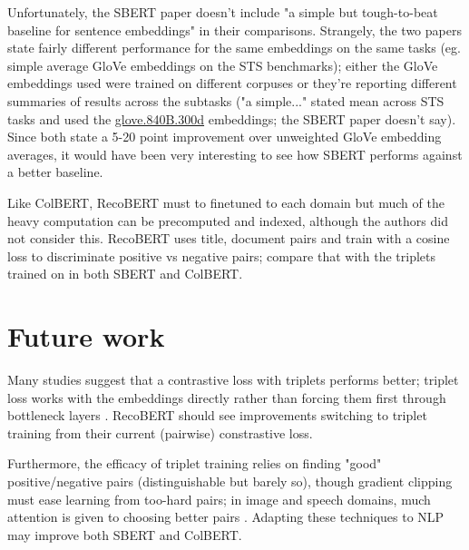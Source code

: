 \documentclass[11pt]{article}
\begin{document}
Unfortunately, the SBERT paper doesn't include "a simple but tough-to-beat baseline for sentence embeddings" \cite{Arora2017} in their comparisons. Strangely, the two papers state fairly different performance for the same embeddings on the same tasks (eg. simple average GloVe embeddings \cite{GloVe} on the STS benchmarks); either the GloVe embeddings used were trained on different corpuses or they're reporting different summaries of results across the subtasks ("a simple..." stated mean across STS tasks and used the \href{https://nlp.stanford.edu/projects/glove/}{glove.840B.300d} embeddings; the SBERT paper doesn't say). Since both state a 5-20 point improvement over unweighted GloVe embedding averages, it would have been very interesting to see how SBERT performs against a better baseline.

Like ColBERT, RecoBERT must to finetuned to each domain but much of the heavy computation can be precomputed and indexed, although the authors did not consider this. RecoBERT uses title, document pairs and train with a cosine loss to discriminate positive vs negative pairs; compare that with the triplets trained on in both SBERT and ColBERT. 


\section{Future work} 

Many studies suggest that a contrastive loss with triplets performs better; triplet loss works with the embeddings directly rather than forcing them first through bottleneck layers \cite{FaceNet}. RecoBERT should see improvements switching to triplet training from their current (pairwise) constrastive loss.

Furthermore, the efficacy of triplet training relies on finding "good" positive/negative pairs (distinguishable but barely so), though gradient clipping must ease learning from too-hard pairs; in image and speech domains, much attention is given to choosing better pairs \cite{triplepairs}. Adapting these techniques to NLP may improve both SBERT and ColBERT. 









\end{document}
